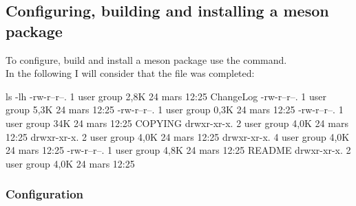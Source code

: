 \subsection{Configuring, building and installing a meson package}

To configure, build and install a meson package use the  command. \\
In the following I will consider that the file  was completed: 
{\footnotesize{
\begin{script}
 ls -lh
-rw-r--r--. 1 user group 2,8K 24 mars  12:25 ChangeLog
-rw-r--r--. 1 user group 5,3K 24 mars  12:25 
-rw-r--r--. 1 user group 0,3K 24 mars  12:25  
-rw-r--r--. 1 user group  34K 24 mars  12:25 COPYING
drwxr-xr-x. 2 user group 4,0K 24 mars  12:25 
drwxr-xr-x. 2 user group 4,0K 24 mars  12:25 
drwxr-xr-x. 4 user group 4,0K 24 mars  12:25 
-rw-r--r--. 1 user group 4,8K 24 mars  12:25 README
drwxr-xr-x. 2 user group 4,0K 24 mars  12:25 
\end{script}
}}

\subsubsection*{Configuration}
\label{mesonconfigure}

